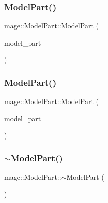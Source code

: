 \hypertarget{structmage_1_1_model_part_a3c39c2c312f07687f8ad5c2c2580d1e2}{}\label{structmage_1_1_model_part_a3c39c2c312f07687f8ad5c2c2580d1e2} 
\subsubsection{\texorpdfstring{Model\+Part()}{ModelPart()}\hspace{0.1cm}{\footnotesize\ttfamily [2/3]}}
{\footnotesize\ttfamily mage\+::\+Model\+Part\+::\+Model\+Part (\begin{DoxyParamCaption}\item[{const \hyperlink{structmage_1_1_model_part}{Model\+Part} \&}]{model\+\_\+part }\end{DoxyParamCaption})\hspace{0.3cm}{\ttfamily [default]}}

\hypertarget{structmage_1_1_model_part_af8744793e9e6eccd59211c87ffc8e745}{}\label{structmage_1_1_model_part_af8744793e9e6eccd59211c87ffc8e745} 
\subsubsection{\texorpdfstring{Model\+Part()}{ModelPart()}\hspace{0.1cm}{\footnotesize\ttfamily [3/3]}}
{\footnotesize\ttfamily mage\+::\+Model\+Part\+::\+Model\+Part (\begin{DoxyParamCaption}\item[{\hyperlink{structmage_1_1_model_part}{Model\+Part} \&\&}]{model\+\_\+part }\end{DoxyParamCaption})\hspace{0.3cm}{\ttfamily [default]}}

\hypertarget{structmage_1_1_model_part_a3322c5c7924ec30be170ae1ed6dca550}{}\label{structmage_1_1_model_part_a3322c5c7924ec30be170ae1ed6dca550} 
\subsubsection{\texorpdfstring{$\sim$\+Model\+Part()}{~ModelPart()}}
{\footnotesize\ttfamily mage\+::\+Model\+Part\+::$\sim$\+Model\+Part (\begin{DoxyParamCaption}{ }\end{DoxyParamCaption})\hspace{0.3cm}{\ttfamily [default]}}



